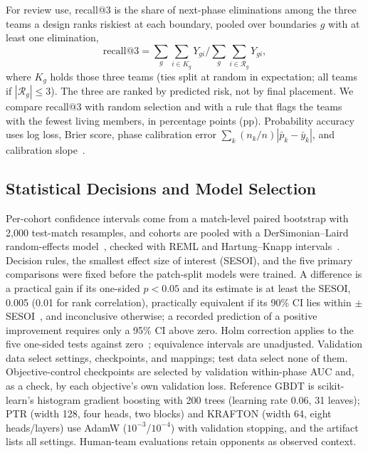\documentclass[sigconf,anonymous]{acmart}
\begin{document}
For review use, recall@3 is the share of next-phase eliminations among the three teams a design ranks riskiest at each boundary, pooled over boundaries $g$ with at least one elimination,
\[
\mathrm{recall@3}=\sum_g\sum_{i\in K_g}Y_{gi}\Big/\sum_g\sum_{i\in\mathcal{R}_g}Y_{gi},
\]
where $K_g$ holds those three teams (ties split at random in expectation; all teams if $|\mathcal{R}_g|\le3$). The three are ranked by predicted risk, not by final placement. We compare recall@3 with random selection and with a rule that flags the teams with the fewest living members, in percentage points (pp). Probability accuracy uses log loss, Brier score, phase calibration error $\sum_k(n_k/n)|\bar p_k-\bar y_k|$, and calibration slope~\cite{VanCalster16}.

\subsection{Statistical Decisions and Model Selection}
Per-cohort confidence intervals come from a match-level paired bootstrap with 2,000 test-match resamples, and cohorts are pooled with a DerSimonian--Laird random-effects model~\cite{DerSimonian86}, checked with REML and Hartung--Knapp intervals~\cite{HartungKnapp01}. Decision rules, the smallest effect size of interest (SESOI), and the five primary comparisons were fixed before the patch-split models were trained. A difference is a practical gain if its one-sided $p<0.05$ and its estimate is at least the SESOI, 0.005 (0.01 for rank correlation), practically equivalent if its 90\% CI lies within $\pm$SESOI~\cite{Schuirmann87}, and inconclusive otherwise; a recorded prediction of a positive improvement requires only a 95\% CI above zero. Holm correction applies to the five one-sided tests against zero~\cite{Holm79}; equivalence intervals are unadjusted. Validation data select settings, checkpoints, and mappings; test data select none of them. Objective-control checkpoints are selected by validation within-phase AUC and, as a check, by each objective's own validation loss. Reference GBDT is scikit-learn's histogram gradient boosting with 200 trees (learning rate 0.06, 31 leaves); PTR (width 128, four heads, two blocks) and KRAFTON (width 64, eight heads/layers) use AdamW ($10^{-3}$/$10^{-4}$) with validation stopping, and the artifact lists all settings. Human-team evaluations retain opponents as observed context.

\end{document}
